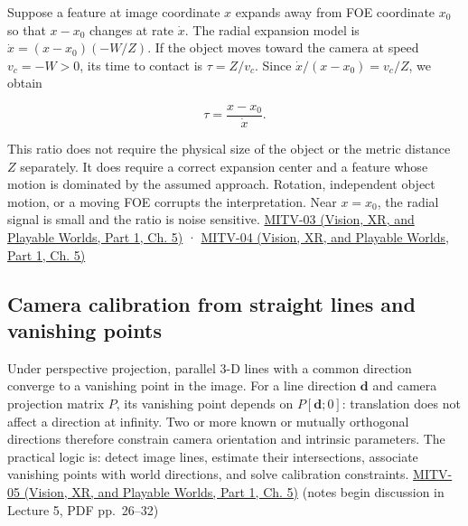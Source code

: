 Suppose a feature at image coordinate \(x\) expands away from FOE coordinate \(x_0\) so that \(x-x_0\) changes at rate \(\dot{x}\). The radial expansion model is \(\dot{x}=(x-x_0)(-W/Z)\). If the object moves toward the camera at speed \(v_c=-W>0\), its time to contact is \(\tau=Z/v_c\). Since \(\dot{x}/(x-x_0)=v_c/Z\), we obtain

\[
\tau=\frac{x-x_0}{\dot{x}}.
\]

This ratio does not require the physical size of the object or the metric distance \(Z\) separately. It does require a correct expansion center and a feature whose motion is dominated by the assumed approach. Rotation, independent object motion, or a moving FOE corrupts the interpretation. Near \(x=x_0\), the radial signal is small and the ratio is noise sensitive. \href{../07-Vision-XR-and-Playable-Worlds-P01/main.pdf\#nameddest=04-visual-computing-ii-ch036-mitv-03---time-to-contact-focus-of-expansion-direct-motion-vision-methods-noise-gain}{MITV-03 (Vision, XR, and Playable Worlds, Part 1, Ch. 5)} · \href{../07-Vision-XR-and-Playable-Worlds-P01/main.pdf\#nameddest=04-visual-computing-ii-ch036-mitv-04---fixed-optical-flow-optical-mouse-constant-brightness-assumption-closed-form-solution}{MITV-04 (Vision, XR, and Playable Worlds, Part 1, Ch. 5)}

\subsection{Camera calibration from straight lines and vanishing points}\label{03-visual-computing-i-ch003-camera-calibration-from-straight-lines-and-vanishing-points}

\hypertarget{03-visual-computing-i-ch003-camera-calibration-from-straight-lines-and-vanishing-points}{}

Under perspective projection, parallel 3-D lines with a common direction converge to a vanishing point in the image. For a line direction \(\mathbf{d}\) and camera projection matrix \(P\), its vanishing point depends on \(P[\mathbf{d};0]\): translation does not affect a direction at infinity. Two or more known or mutually orthogonal directions therefore constrain camera orientation and intrinsic parameters. The practical logic is: detect image lines, estimate their intersections, associate vanishing points with world directions, and solve calibration constraints. \href{../07-Vision-XR-and-Playable-Worlds-P01/main.pdf\#nameddest=04-visual-computing-ii-ch036-mitv-05---tcc-and-for-montivision-demos-vanishing-point-use-of-vps-in-camera-calibration}{MITV-05 (Vision, XR, and Playable Worlds, Part 1, Ch. 5)} (notes begin discussion in Lecture 5, PDF pp.~26--32)

